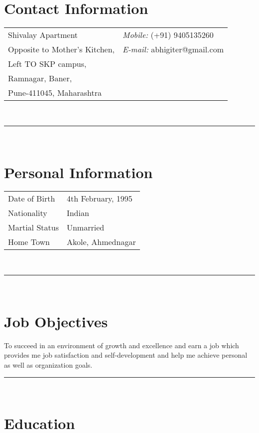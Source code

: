 \documentclass[letterpaper,margin,line]{RES}
\def\mmmyline{\rule{\textwidth}{1pt}\\}
\begin{document}

\begin{resume}
\section{\sc Contact Information}
\begin{tabular}{@{}p{2in}p{4in}}
Shivalay Apartment                      & {\it Mobile:}  (+91) 9405135260 \\            
Opposite to Mother's Kitchen,      & {\it E-mail:} {abhigiter@gmail.com}  \\       
Left TO SKP campus,          &  \\ 
Ramnagar, Baner,          &  \\ 
Pune-411045, Maharashtra    & \\ 
\end{tabular}
\\

\mmmyline

\section{\sc Personal Information}
\begin{tabular}{@{}p{2in}p{4in}}
Date of Birth  & 4th February, 1995 \\            
Nationality    & Indian  \\            
Martial Status & Unmarried \\            
Home Town      & Akole, Ahmednagar\\
\end{tabular}
\\

\mmmyline

\section{\sc Job Objectives}
To succeed in an environment of growth and excellence and earn a job which provides me job satisfaction and self-development and help me achieve personal as well as organization goals.

\mmmyline


\section{\sc Education}
\begin{tabular}{@{}p{4in}p{.75in}p{.75in}}


\end{tabular}
\end{resume}
\end{document}

